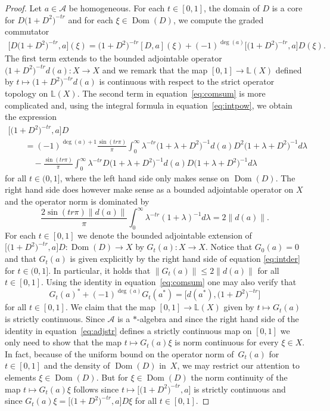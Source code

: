 \documentclass[pdftex]{sigma}
\numberwithin{equation}{section}
\newcommand{\la}{\lambda}
\newcommand{\s}[1]{\mathscr{#1}}
\newcommand{\B}[1]{\mathbb{#1}}
\begin{document}
\begin{proof}
Let $a \in \s A$ be homogeneous. For each $t \in [0,1]$, the domain of $D$ is a core for $D\big(1 + D^2\big)^{-tr}$ and for each $\xi \in \operatorname{Dom}(D)$, we compute the graded commutator
\begin{gather}\label{eq:comsum}
\big[ D \big(1 + D^2\big)^{- tr} , a \big](\xi) = \big(1 + D^2\big)^{-tr} [D,a] (\xi) + (-1)^{\deg (a)}\big[ \big(1 + D^2\big)^{-tr},a\big] D(\xi) .
\end{gather}
The first term extends to the bounded adjointable operator $\big(1 + D^2\big)^{-tr} d(a)\colon X \to X$ and we remark that the map $[0,1] \to \B L(X)$ defined by $t \mapsto \big(1 + D^2\big)^{-tr} d(a)$ is continuous with respect to the strict operator topology on $\B L(X)$. The second term in equation~\eqref{eq:comsum} is more complicated and, using the integral formula in equation~\eqref{eq:intpow}, we obtain the expression
\begin{gather}
\big[ \big(1 + D^2\big)^{-tr},a\big] D \nonumber\\
\qquad{} = (-1)^{\deg (a) + 1} \frac{\sin(tr \pi)}{\pi} \int_0^\infty \la^{-tr} \big(1 + \la + D^2\big)^{-1} d(a) D^2 \big(1 + \la + D^2\big)^{-1} d\la \nonumber\\
\qquad\quad{} - \frac{\sin(tr \pi)}{\pi} \int_0^\infty \la^{-tr} D \big(1 + \la + D^2\big)^{-1} d(a) D \big(1 + \la + D^2\big)^{-1} d\la\label{eq:intder}
\end{gather}
for all $t \in (0,1]$, where the left hand side only makes sense on $\operatorname{Dom}(D)$. The right hand side does however make sense as a bounded adjointable operator on $X$ and the operator norm is dominated by
\[
\frac{2 \sin(tr \pi) \| d(a) \| }{\pi} \int_0^\infty \la^{-tr} (1 + \la)^{-1} d\la = 2 \| d(a) \| .
\]
For each $t \in [0,1]$ we denote the bounded adjointable extension of $\big[\big(1 + D^2\big)^{-tr},a\big] D\colon \operatorname{Dom}(D) \allowbreak \to X$ by $G_t(a)\colon X \to X$. Notice that $G_0(a) = 0$ and that $G_t(a)$ is given explicitly by the right hand side of equation \eqref{eq:intder} for $t \in (0,1]$. In particular, it holds that $\| G_t(a) \| \leq 2 \| d(a) \|$ for all $t \in [0,1]$. Using the identity in equation~\eqref{eq:comsum} one may also verify that
\begin{equation}\label{eq:adjstr}
G_t(a)^* + (-1)^{\deg (a)}G_t(a^*) = \big[ d(a^*), \big(1 + D^2\big)^{-tr} \big]
\end{equation}
for all $t \in [0,1]$. We claim that the map $[0,1] \to \B L(X)$ given by $t \mapsto G_t(a)$ is strictly continuous. Since $\s A$ is a $*$-algebra and since the right hand side of the identity in equation~\eqref{eq:adjstr} defines a strictly continuous map on $[0,1]$ we only need to show that the map $t \mapsto G_t(a) \xi$ is norm continuous for every $\xi \in X$. In fact, because of the uniform bound on the operator norm of~$G_t(a)$ for $t \in [0,1]$ and the density of $\operatorname{Dom}(D)$ in~$X$, we may restrict our attention to elements $\xi \in \operatorname{Dom}(D)$. But for $\xi \in \operatorname{Dom}(D)$ the norm continuity of the map $t \mapsto G_t(a) \xi$ follows since $t \mapsto \big[ \big(1 + D^2\big)^{-tr}, a\big]$ is strictly continuous and since $G_t(a) \xi = \big[ \big(1 + D^2\big)^{-tr},a\big] D \xi$ for all $t \in [0,1]$.


\end{proof}
\end{document}
